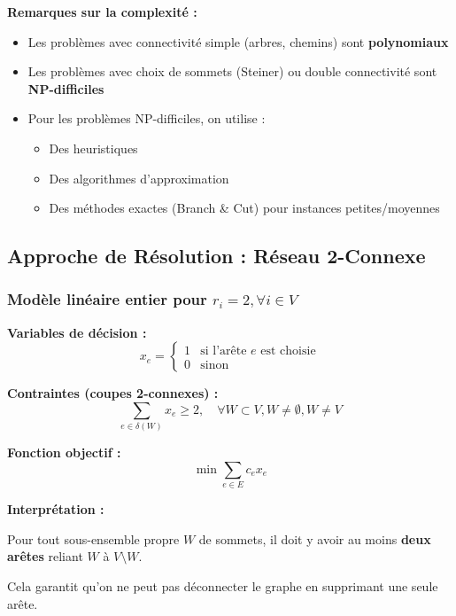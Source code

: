 \documentclass[12pt,a4paper]{article}
\begin{document}
\begin{notecours}
\textbf{Remarques sur la complexité :}

\begin{itemize}
    \item Les problèmes avec connectivité simple (arbres, chemins) sont \textcolor{defvert}{\textbf{polynomiaux}}
    \item Les problèmes avec choix de sommets (Steiner) ou double connectivité sont \textcolor{importantrouge}{\textbf{NP-difficiles}}
    \item Pour les problèmes NP-difficiles, on utilise :
    \begin{itemize}
        \item Des heuristiques
        \item Des algorithmes d'approximation
        \item Des méthodes exactes (Branch \& Cut) pour instances petites/moyennes
    \end{itemize}
\end{itemize}
\end{notecours}

\newpage
\subsection{Approche de Résolution : Réseau 2-Connexe}

\subsubsection{Modèle linéaire entier pour $r_i = 2, \forall i \in V$}

\begin{definition}
\textbf{Variables de décision :}
$$x_e = \begin{cases}
1 & \text{si l'arête } e \text{ est choisie}\\
0 & \text{sinon}
\end{cases}$$

\textbf{Contraintes (coupes 2-connexes) :}
$$\sum_{e \in \delta(W)} x_e \geq 2, \quad \forall W \subset V, W \neq \emptyset, W \neq V$$

\textbf{Fonction objectif :}
$$\min \sum_{e \in E} c_e x_e$$
\end{definition}

\begin{notecours}
\textbf{Interprétation :}

Pour tout sous-ensemble propre $W$ de sommets, il doit y avoir au moins \textcolor{titrebleu}{\textbf{deux arêtes}} reliant $W$ à $V \setminus W$.

Cela garantit qu'on ne peut pas déconnecter le graphe en supprimant une seule arête.
\end{notecours}
\end{document}
